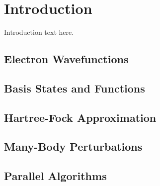 \chapter{Introduction}\label{ch:introduction}

Introduction text here.

\section{Electron Wavefunctions}\label{sec:electronwavefunction}
\section{Basis States and Functions}\label{sec:basisstates}
\section{Hartree-Fock Approximation}\label{sec:hartreefock}
\section{Many-Body Perturbations}\label{sec:manybodyperturbations}
\section{Parallel Algorithms}\label{sec:parallelalgorithms}

